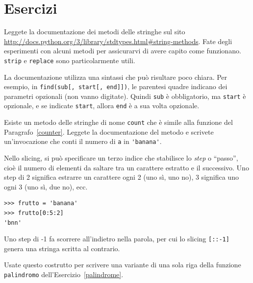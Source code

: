 \documentclass[10pt]{book}
\begin{document}
\section{Esercizi}

\begin{exercise}

Leggete la documentazione dei metodi delle stringhe sul sito
\url{http://docs.python.org/3/library/stdtypes.html#string-methods}.
Fate degli esperimenti con alcuni metodi per assicurarvi di avere capito come funzionano. {\tt strip} e {\tt replace} sono particolarmente utili.

La documentazione utilizza una sintassi che può risultare poco chiara. Per esempio, in \verb"find(sub[, start[, end]])", le parentesi quadre indicano dei parametri opzionali (non vanno digitate). Quindi {\tt sub} è obbligatorio, ma
{\tt start} è opzionale, e se indicate {\tt start}, allora {\tt end} è a sua volta opzionale.

\end{exercise}

\vspace{0.2in}
\begin{exercise}

Esiste un metodo delle stringhe di nome {\tt count} che è simile alla funzione del Paragrafo~\ref{counter}.  Leggete la documentazione del metodo e scrivete un'invocazione che conti il numero di {\tt a} in \verb"'banana'".
\end{exercise}

\vspace{0.2in}
\begin{exercise}

Nello slicing, si può specificare un terzo indice che stabilisce lo {\em step} o ``passo'', cioè il numero di elementi da saltare tra un carattere estratto e il successivo. Uno step di 2 significa estrarre un carattere ogni 2 (uno sì, uno no), 3 significa uno ogni 3 (uno sì, due no), ecc.

\begin{verbatim}
>>> frutto = 'banana'
>>> frutto[0:5:2]
'bnn'
\end{verbatim}

Uno step di -1 fa scorrere all'indietro nella parola, per cui lo slicing \verb"[::-1]" genera una stringa scritta al contrario.

Usate questo costrutto per scrivere una variante di una sola riga della funzione \verb"palindromo" dell'Esercizio~\ref{palindrome}.
\end{exercise}
\end{document}
